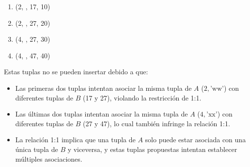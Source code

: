 \begin{enumerate}
    \item (2, , 17, 10)
    \item (2, , 27, 20)
    \item (4, , 27, 30)
    \item (4, , 47, 40)
\end{enumerate}


Estas tuplas no se pueden insertar debido a que:

\begin{itemize}
    \item Las primeras dos tuplas intentan asociar la misma tupla de \( A \) (\( 2, \text{'ww'} \)) con diferentes tuplas de \( B \) (17 y 27), violando la restricción de 1:1.
    \item Las últimas dos tuplas intentan asociar la misma tupla de \( A \) (\( 4, \text{'xx'} \)) con diferentes tuplas de \( B \) (27 y 47), lo cual también infringe la relación 1:1.
    \item La relación 1:1 implica que una tupla de \( A \) solo puede estar asociada con una única tupla de \( B \) y viceversa, y estas tuplas propuestas intentan establecer múltiples asociaciones.
\end{itemize}
